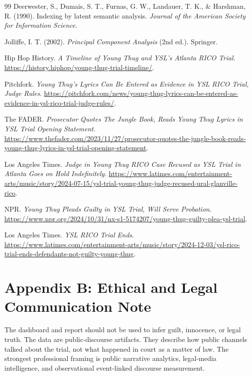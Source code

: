 \documentclass[12pt]{article}
\begin{document}
\begin{thebibliography}{99}
Deerwester, S., Dumais, S. T., Furnas, G. W., Landauer, T. K., \& Harshman, R. (1990). Indexing by latent semantic analysis. \emph{Journal of the American Society for Information Science}.

Jolliffe, I. T. (2002). \emph{Principal Component Analysis} (2nd ed.). Springer.

Hip Hop History. \emph{A Timeline of Young Thug and YSL's Atlanta RICO Trial}. \url{https://history.hiphop/young-thug-trial-timeline/}.

Pitchfork. \emph{Young Thug's Lyrics Can Be Entered as Evidence in YSL RICO Trial, Judge Rules}. \url{https://pitchfork.com/news/young-thug-lyrics-can-be-entered-as-evidence-in-ysl-rico-trial-judge-rules/}.

The FADER. \emph{Prosecutor Quotes The Jungle Book, Reads Young Thug Lyrics in YSL Trial Opening Statement}. \url{https://www.thefader.com/2023/11/27/prosecutor-quotes-the-jungle-book-reads-young-thug-lyrics-in-ysl-trial-opening-statement}.

Los Angeles Times. \emph{Judge in Young Thug RICO Case Recused as YSL Trial in Atlanta Goes on Hold Indefinitely}. \url{https://www.latimes.com/entertainment-arts/music/story/2024-07-15/ysl-trial-young-thug-judge-recused-ural-glanville-rico}.

NPR. \emph{Young Thug Pleads Guilty in YSL Trial, Will Serve Probation}. \url{https://www.npr.org/2024/10/31/nx-s1-5174207/young-thug-guilty-plea-ysl-trial}.

Los Angeles Times. \emph{YSL RICO Trial Ends}. \url{https://www.latimes.com/entertainment-arts/music/story/2024-12-03/ysl-rico-trial-ends-defendants-not-guilty-young-thug}.
\end{thebibliography}
\section{Appendix B: Ethical and Legal Communication Note}
The dashboard and report should not be used to infer guilt, innocence, or legal truth. The data are public-discourse artifacts. They describe how public channels talked about the trial, not what happened in court as a matter of law. The strongest professional framing is public narrative analytics, legal-media intelligence, and observational event-linked discourse measurement.
\end{document}
